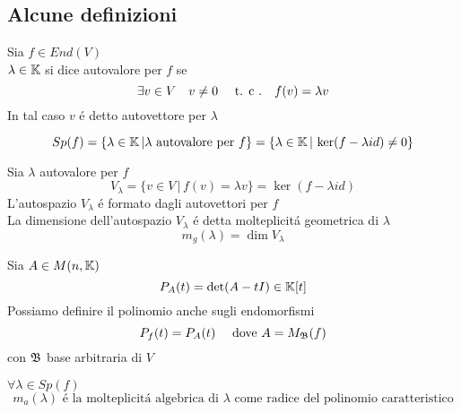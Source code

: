 \subsection{Alcune definizioni}

\begin{defn}\bianco
Sia $f \in End(V) $ \\
$ \lambda \in \mathbb{K} $ si dice autovalore per $f$ se 
$$ \exists v \in V \quad v\neq 0  \quad \text{ t. c .} \quad f(v)= \lambda v $$
In tal caso $v$ \'e detto autovettore per $\lambda$
\end{defn}
\begin{defn}[Spettro]
$$Sp(f)=\{ \lambda \in \mathbb{K} \, \vert  \lambda \text{ autovalore per } f \} = \{ \lambda \in \mathbb{K} \, \vert \, \ker(f-\lambda id) \neq 0 \}$$ 
\end{defn}
\begin{defn} Sia $\lambda $ autovalore per $f$
$$ V_\lambda =\{ v \in V \, \vert \, f(v)=\lambda v \}  = \ker (f-\lambda id) $$
L'autospazio $V_\lambda$ \'e formato dagli autovettori per $f$ \\
La dimensione dell'autospazio $V_\lambda$ \'e detta  molteplicit\'a geometrica di $\lambda$
$$ m_g (\lambda)=\dim V_\lambda $$
\end{defn}
\spazio
\begin{defn}\bianco
Sia $A\in M(n , \mathbb{K}) $ 
$$ P_A(t)= \det (A -tI) \in \mathbb{K}[t]$$
Possiamo definire il polinomio anche sugli endomorfismi 
$$ P_f(t)=P_A(t) \quad \text{ dove } A = M_{\mathfrak{B}}(f) $$
con $\mathfrak{B}$ base arbitraria di $V$
\end{defn}
\begin{defn}
$\forall \lambda \in Sp(f)$ $$m_a(\lambda )  \text{ \'e la molteplicit\'a algebrica di }  \lambda  \text{ come radice del polinomio caratteristico} $$
\end{defn}
\newpage
